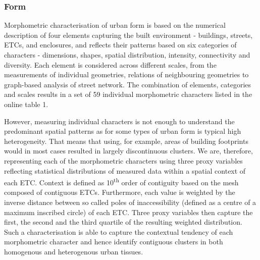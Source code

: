 \subsubsection*{Form}
Morphometric characterisation of urban form is based on the numerical description
of four elements capturing the built environment - buildings, streets, ETCs, and
enclosures, and reflects their patterns based on six categories of characters - dimensions, shapes, spatial
distribution, intensity, connectivity and diversity\cite{fleischmann2020a}. Each element is considered across
different scales, from the measurements of individual geometries, relations of
neighbouring geometries to graph-based analysis of street network. The combination of
elements, categories and scales results in a set of 59 individual morphometric
characters listed in the online table 1.


However, measuring individual characters is not enough to understand the predominant
spatial patterns as for some types of urban form is typical high heterogeneity. That
means that using, for example, areas of building footprints would in most cases resulted
in largely discontinuous clusters. We are, therefore, representing each of the
morphometric characters using three proxy variables reflecting statistical distributions
of measured data within a spatial context of each ETC. Context is defined as
10\textsuperscript{th}
order of contiguity based on the mesh composed of contiguous ETCs. Furthermore, each
value is weighted by the inverse distance between so called poles of inaccessibility
(defined as a centre of a maximum inscribed circle) of each ETC. Three proxy variables
then capture the first, the second and the third quartile of the resulting weighted
distribution. Such a characterisation is able to capture the contextual tendency of each
morphometric character and hence identify contiguous clusters in both homogenous and
heterogenous urban tissues.

